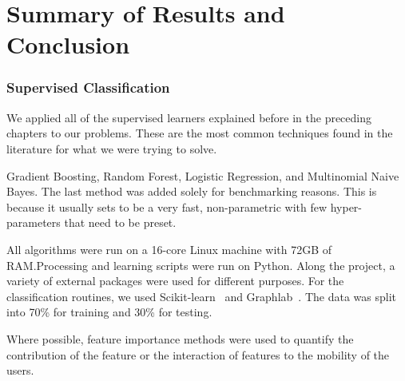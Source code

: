
\chapter{Summary of Results and Conclusion}\label{cha:results_conclusion}




\subsection{Supervised Classification}

We applied all of the supervised learners explained before in the preceding chapters to our problems. These are the most common techniques found in the literature for what we were trying to solve.

Gradient Boosting, Random Forest, Logistic Regression, and Multinomial Naive Bayes. The last method was added solely for benchmarking reasons. This is because it usually sets to be a very fast, non-parametric with few hyper-parameters that need to be preset.

All algorithms were run on a 16-core Linux machine with 72GB of RAM.\@ Processing and learning scripts were run on Python. %
Along the project, a variety of external packages were used for different purposes. For the classification routines, we used Scikit-learn~\textcite{scikit-learn} and Graphlab~\textcite{graphlab}.
The data was split into 70\% for training and 30\% for testing.




Where possible, feature importance methods were used to quantify the contribution of the feature or the interaction of features to the mobility of the users.




